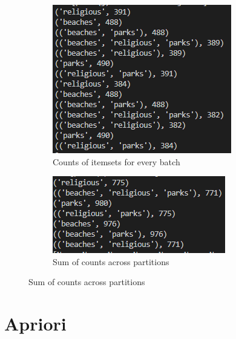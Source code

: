 \documentclass[a4paper]{article}
\begin{document}
	\begin{figure}[h]
		\centering
		
		\begin{subfigure}[b]{0.4\textwidth}
			\centering
			\includegraphics[width=\textwidth]{counts.PNG}
         	\caption{Counts of itemsets for every batch}
         	\label{fig:counts}
		\end{subfigure}
		\hfill
		\begin{subfigure}[b]{0.4\textwidth}
			\centering
			\includegraphics[width=\textwidth]{totals.PNG}
         	\caption{Sum of counts across partitions}
         	\label{fig:totals}
		\end{subfigure}
	\end{figure}
	
	\newpage
	
	\section{Apriori}
	\label{section:apriori}
	
\end{document}
